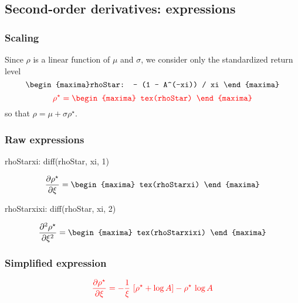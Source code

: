 \subsection{Second-order derivatives: expressions}

\subsubsection*{Scaling}
Since $\rho$ is a linear function of $\mu$ and $\sigma$, we
consider only the standardized return level
\begin{equation*}%
  \begin{maxima}%
    rhoStar: - (1 - A^(-xi)) / xi
  \end{maxima}%
\end{equation*}%
\begin{equation}
  \label{eq:ScaleRho}
  \color{red}
  \rho^\star=
  \begin{maxima}
    tex(rhoStar)
  \end{maxima}
\end{equation}
so that $\rho = \mu + \sigma \rho^\star$.

\subsubsection*{Raw expressions}
\begin{maxima}
  rhoStarxi:  diff(rhoStar, xi, 1)
\end{maxima}

{\color{MonVertF}
\[
\frac{\partial \rho^\star}{\partial \xi} = 
\begin{maxima}
  tex(rhoStarxi)
\end{maxima}
\]}


\begin{maxima}
  rhoStarxixi:  diff(rhoStar, xi, 2)
\end{maxima}

{\color{MonVertF}
\[
\frac{\partial^2 \rho^\star}{\partial \xi^2} = 
\begin{maxima}
  tex(rhoStarxixi)
\end{maxima}
\]}

\subsubsection*{Simplified expression}
\begin{equation}
  \label{eq:SimpDer1RhoStar}
  \color{red}
  \frac{\partial \rho^\star}{\partial \xi} =
  - \frac{1}{\xi}\, \left[ \rho^\star + \log A \right] - \rho^\star \, \log A
\end{equation}


